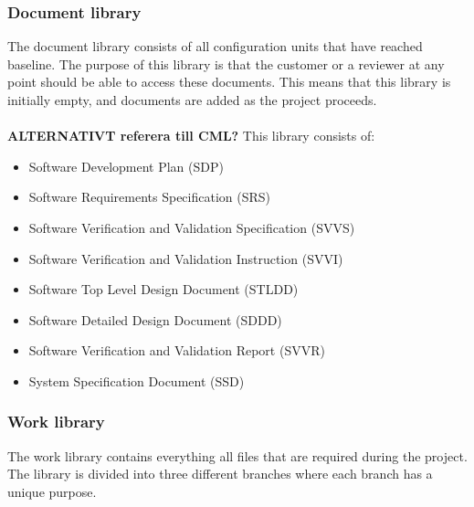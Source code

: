 \documentclass{article}
\begin{document}
        \subsubsection{Document library}
            The document library consists of all configuration units that have reached baseline.
            The purpose of this library is that the customer or a reviewer at any point should
            be able to access these documents.
            This means that this library is initially empty, and documents are added as the project proceeds.
            \\ \\
            \textbf{ALTERNATIVT referera till CML?}
            This library consists of:
            \begin{itemize}
                \item Software Development Plan (SDP)
                \item Software Requirements Specification (SRS)
                \item Software Verification and Validation Specification (SVVS)
                \item Software Verification and Validation Instruction (SVVI)
                \item Software Top Level Design Document (STLDD)
                \item Software Detailed Design Document (SDDD)
                \item Software Verification and Validation Report (SVVR)
                \item System Specification Document (SSD)
            \end{itemize}
            
        \subsubsection{Work library}
            The work library contains everything all files that are required during the project.
            The library is divided into three different branches where each branch has a unique purpose.
            
\end{document}
